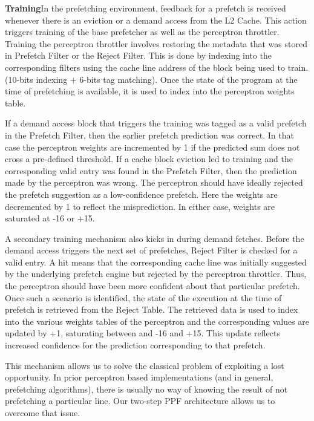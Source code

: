 \textbf{Training}\newline In the prefetching environment, feedback for a
prefetch is received whenever there is an eviction or a demand access from the
L2 Cache.  This action triggers training of the base prefetcher as well as the
perceptron throttler.  Training the perceptron throttler involves restoring
the metadata that was stored in Prefetch Filter or the Reject Filter.  This is
done by indexing into the corresponding filters using the cache line address
of the block being used to train. (10-bits indexing + 6-bits tag matching).
Once the state of the program at the time of prefetching is available, it is
used to index into the perceptron weights table.

If a demand access block that triggers the training was tagged as a valid
prefetch in the Prefetch Filter, then the earlier prefetch prediction was
correct.  In that case the perceptron weights are incremented by 1 if the
predicted sum does not cross a pre-defined threshold.  If a cache block
eviction led to training and the corresponding valid entry was found in the
Prefetch Filter, then the prediction made by the perceptron was wrong.  The
perceptron should have ideally rejected the prefetch suggestion as a
low-confidence prefetch.  Here the weights are decremented by 1 to reflect the
misprediction. In either case, weights are saturated at -16 or +15.

A secondary training mechanism also kicks in during demand fetches.  Before
the demand access triggers the next set of prefetches, Reject Filter is
checked for a valid entry.  A hit means that the corresponding cache line was
initially suggested by the underlying prefetch engine but rejected by the
perceptron throttler.  Thus, the perceptron should have been more confident
about that particular prefetch.  Once such a scenario is identified, the state
of the execution at the time of prefetch is retrieved from the Reject Table.
The retrieved data is used to index into the various weights tables of the
perceptron and the corresponding values are updated by +1, saturating between
and -16 and +15.  This update reflects increased confidence for the prediction
corresponding to that prefetch.

This mechanism allows us to solve the classical problem of exploiting a lost
opportunity.  In prior perceptron based implementations (and in general,
prefetching algorithms), there is usually no way of knowing the result of not
prefetching a particular line.  Our two-step PPF architecture allows us to
overcome that issue.

